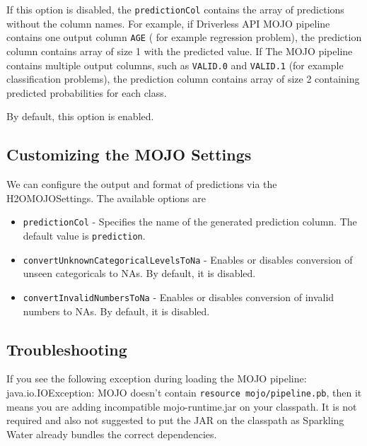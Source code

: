 If this option is disabled, the \texttt{predictionCol} contains the array of predictions without
the column names. For example, if Driverless API MOJO pipeline contains one output column \texttt{AGE} ( for example regression problem),
the prediction column contains array of size 1 with the predicted value.
If The MOJO pipeline contains multiple output columns, such as \texttt{VALID.0} and \texttt{VALID.1} (for example classification problems),
the prediction column contains array of size 2 containing predicted probabilities for each class.

By default, this option is enabled.

\subsection{Customizing the MOJO Settings}

We can configure the output and format of predictions via the H2OMOJOSettings. The available options are

\begin{itemize}
    \item \texttt{predictionCol} - Specifies the name of the generated prediction column. The default value is \texttt{prediction}.
    \item \texttt{convertUnknownCategoricalLevelsToNa} - Enables or disables conversion of unseen categoricals to NAs. By default, it is disabled.
    \item \texttt{convertInvalidNumbersToNa} - Enables or disables conversion of invalid numbers to NAs. By default, it is disabled.
\end{itemize}


\subsection{Troubleshooting}

If you see the following exception during loading the MOJO pipeline:\\
java.io.IOException: MOJO doesn't contain \texttt{resource mojo/pipeline.pb}, then it means you are adding
incompatible mojo-runtime.jar on your classpath. It is not required and also not suggested
to put the JAR on the classpath as Sparkling Water already bundles the correct dependencies.
